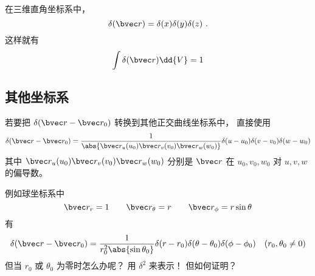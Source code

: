 
\begin{issues}
\issueDraft
\end{issues}


在三维直角坐标系中， 
\begin{equation}
\delta(\bvec r) = \delta(x)\delta(y)\delta(z)~.
\end{equation}
这样就有
\begin{equation}
\int \delta(\bvec r) \dd{V} = 1
\end{equation}

\subsection{其他坐标系}
若要把 $\delta(\bvec r - \bvec r_0)$ 转换到其他正交曲线坐标系中， 直接使用
\begin{equation}
\delta(\bvec r - \bvec r_0) = \frac{1}{\abs{\bvec r_u(u_0)\bvec r_v(v_0)\bvec r_w(w_0)}}\delta(u - u_0)\delta(v - v_0)\delta(w - w_0)
\end{equation}
其中 $\bvec r_u(u_0)\bvec r_v(v_0)\bvec r_w(w_0)$ 分别是 $\bvec r$ 在 $u_0,v_0,w_0$ 对 $u, v, w$ 的偏导数。

例如球坐标系中
\begin{equation}
\bvec r_r = 1 \qquad \bvec r_\theta = r \qquad \bvec r_\phi = r\sin\theta
\end{equation}
有
\begin{equation}
\delta(\bvec r - \bvec r_0) = \frac{1}{r_0^2\abs{\sin\theta_0}}\delta(r - r_0)\delta(\theta - \theta_0)\delta(\phi - \phi_0)
\quad (r_0, \theta_0 \ne 0)
\end{equation}
但当 $r_0$ 或 $\theta_0$ 为零时怎么办呢？ 用 $\delta^2$ 来表示！ 但如何证明？

